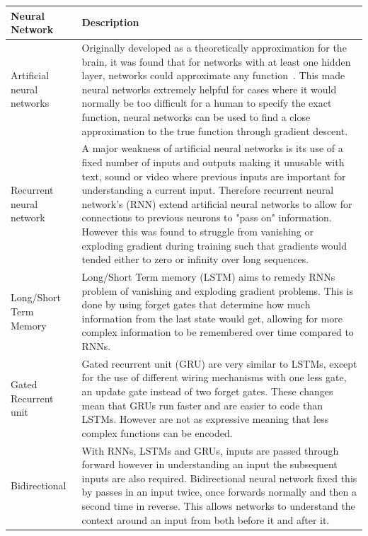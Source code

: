 \begin{longtable}{|p{3.5cm}|p{12cm}|} \hline
    \textbf{Neural Network} & \textbf{Description} \\ \hline
    Artificial neural networks \citep{ANN} & Originally developed as a theoretically approximation for the brain, it
        was found that for networks with at least one hidden layer, networks could approximate any
        function~\citep{csaji2001approximation}. This made neural networks extremely helpful for cases where it would
        normally be too difficult for a human to specify the exact function, neural networks can be used to find a
        close approximation to the true function through gradient descent. \\ \hline

    Recurrent neural network~\citep{RNN} & A major weakness of artificial neural networks is its use of a fixed
        number of inputs and outputs making it unusable with text, sound or video where previous inputs are important
        for understanding a current input. Therefore recurrent neural network's (RNN) extend artificial neural networks
        to allow for connections to previous neurons to "pass on" information. However this was found to struggle from
        vanishing or exploding gradient during training such that gradients would tended either to zero or infinity
        over long sequences. \\ \hline

    Long/Short Term Memory \citep{LSTM} & Long/Short Term memory (LSTM) aims to remedy RNNs problem of vanishing and
        exploding gradient problems. This is done by using forget gates that determine how much information from the
        last state would get, allowing for more complex information to be remembered over time compared to RNNs. \\ \hline

    Gated Recurrent unit~\citep{GRU} & Gated recurrent unit (GRU) are very similar to LSTMs, except for the use of
        different wiring mechanisms with one less gate, an update gate instead of two forget gates. These changes mean
        that GRUs run faster and are easier to code than LSTMs. However are not as expressive meaning that less complex
        functions can be encoded. \\ \hline

    Bidirectional \citep{Bidirectional} & With RNNs, LSTMs and GRUs, inputs are passed through forward however in
        understanding an input the subsequent inputs are also required. Bidirectional neural network fixed this by
        passes in an input twice, once forwards normally and then a second time in reverse. This allows networks to
        understand the context around an input from both before it and after it. \\ \hline


\end{longtable}
